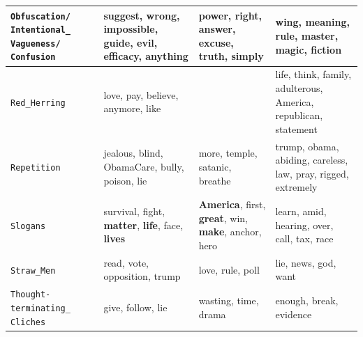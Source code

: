 \begin{table}[!htbp]
{\begin{tabular}{p{}|p{}|p{}|p{}}
            \hline
            \texttt{Obfuscation/ Intentional\_ Vagueness/ Confusion} & suggest, wrong, impossible, guide, evil, efficacy, anything                   & power, right, answer, excuse, truth, simply                                                                                             & wing, meaning, rule, master, magic, fiction                                          \\
            \hline
            \texttt{Red\_Herring}                                    & love, pay, believe, anymore, like                                             &                                                                                                                                         & life, think, family, adulterous, America, republican, statement                      \\
            \hline
            \texttt{Repetition}                                      & jealous, blind, ObamaCare, bully, poison, lie                                 & more, temple, satanic, breathe                                                                                                          & trump, obama, abiding, careless, law, pray, rigged, extremely                        \\
            \hline
            \texttt{Slogans}                                         & survival, fight, \textbf{matter}, \textbf{life}, face, \textbf{lives}         & \textbf{America}, first, \textbf{great}, win, \textbf{make}, anchor, hero                                                               & learn, amid, hearing, over, call, tax, race                                          \\
            \hline
            \texttt{Straw\_Men}                                      & read, vote, opposition, trump                                                 & love, rule, poll                                                                                                                        & lie, news, god, want                                                                 \\
            \hline
            \texttt{Thought-terminating\_ Cliches}                   & give, follow, lie                                                             & wasting, time, drama                                                                                                                    & enough, break, evidence                                                              \\

\end{tabular}}
\end{table}
